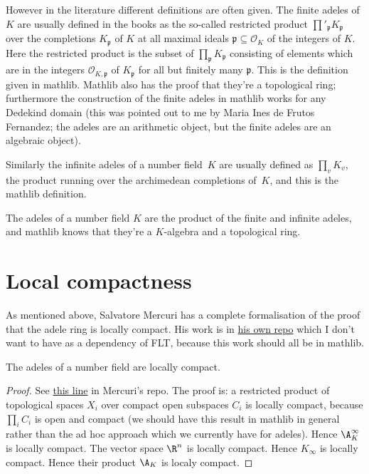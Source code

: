 However in the literature different definitions
are often given. The finite adeles of $K$ are usually defined in the books
as the so-called restricted product $\prod'_{\mathfrak{p}}K_{\mathfrak{p}}$ over the completions
$K_{\mathfrak{p}}$ of $K$ at all maximal ideals $\mathfrak{p}\subseteq\mathcal{O}_K$ of the
integers of $K$. Here the restricted product is the subset of $\prod_{\mathfrak{p}}K_{\mathfrak{p}}$
consisting of elements which are in the integers $\mathcal{O}_{K,\mathfrak{p}}$ of
$K_{\mathfrak{p}}$ for all but finitely many $\mathfrak{p}$. This is the definition given in
mathlib. Mathlib also has the proof that they're a topological ring;
furthermore the construction of the finite adeles in mathlib works for any
Dedekind domain (this was pointed out to me by Maria Ines de Frutos Fernandez; the adeles
are an arithmetic object, but the finite adeles are an algebraic object).

Similarly the infinite adeles of a number field~$K$
are usually defined as $\prod_v K_v$,
the product running over the archimedean completions of~$K$, and this is
the mathlib definition.

The adeles of a number field $K$ are the product of the finite and infinite
adeles, and mathlib knows that they're a $K$-algebra and a topological ring.

\section{Local compactness}

As mentioned above, Salvatore Mercuri has a complete formalisation of the proof
that the adele ring is locally compact. His work is in
\href{https://github.com/smmercuri/adele-ring_locally-compact}{his own repo} which
I don't want to have as a dependency of FLT, because this work should all be
in mathlib.

\begin{theorem}
  \label{NumberField.AdeleRing.locallyCompactSpace}
  \leanok
  The adeles of a number field are locally compact.
\end{theorem}
\begin{proof}
  See \href{https://github.com/smmercuri/adele-ring_locally-compact/blob/e8e34608c139ee95a1e21d9d24f138524196a2e1/AdeleRingLocallyCompact/NumberTheory/NumberField/AdeleRing.lean#L70}
  {this line} in Mercuri's repo. The proof is: a restricted product of topological spaces $X_i$
  over compact open subspaces $C_i$ is locally compact, because $\prod_i C_i$ is open and compact
  (we should have this result in mathlib in general rather than the ad hoc approach which we
  currently have for adeles).
  Hence $\A_K^\infty$ is locally compact.
  The vector space $\R^n$ is locally compact. Hence $K_{\infty}$ is locally compact.
  Hence their product $\A_K$ is localy compact.
\end{proof}

